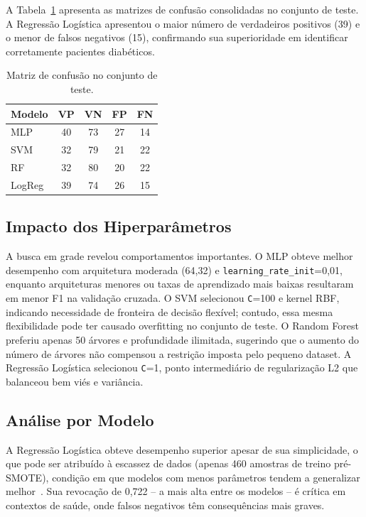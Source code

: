 \documentclass[conference]{IEEEtran}
\begin{document}
A Tabela~\ref{tab:confusao} apresenta as matrizes de confus\~ao consolidadas no conjunto de teste. A Regress\~ao Log\'{i}stica apresentou o maior n\'{u}mero de verdadeiros positivos (39) e o menor de falsos negativos (15), confirmando sua superioridade em identificar corretamente pacientes diab\'{e}ticos.

\begin{table}[H]
\caption{Matriz de confus\~ao no conjunto de teste.}
\label{tab:confusao}
\centering
\scriptsize
\setlength{\tabcolsep}{4pt}
\begin{tabular}{@{}lcccc@{}}
\toprule
Modelo & VP & VN & FP & FN \\
\midrule
MLP & 40 & 73 & 27 & 14 \\
SVM & 32 & 79 & 21 & 22 \\
RF & 32 & 80 & 20 & 22 \\
LogReg & 39 & 74 & 26 & 15 \\
\bottomrule
\end{tabular}
\end{table}

\subsection{Impacto dos Hiperpar\^{a}metros}

A busca em grade revelou comportamentos importantes. O MLP obteve melhor desempenho com arquitetura moderada (64,32) e \texttt{learning\_rate\_init}=0,01, enquanto arquiteturas menores ou taxas de aprendizado mais baixas resultaram em menor F1 na valida\c{c}\~ao cruzada. O SVM selecionou \texttt{C}=100 e kernel RBF, indicando necessidade de fronteira de decis\~ao flex\'{i}vel; contudo, essa mesma flexibilidade pode ter causado overfitting no conjunto de teste. O Random Forest preferiu apenas 50 \'{a}rvores e profundidade ilimitada, sugerindo que o aumento do n\'{u}mero de \'{a}rvores n\~ao compensou a restri\c{c}\~ao imposta pelo pequeno dataset. A Regress\~ao Log\'{i}stica selecionou \texttt{C}=1, ponto intermedi\'{a}rio de regulariza\c{c}\~ao L2 que balanceou bem vi\'{e}s e vari\^{a}ncia.

\subsection{An\'{a}lise por Modelo}

A Regress\~ao Log\'{i}stica obteve desempenho superior apesar de sua simplicidade, o que pode ser atribu\'{i}do \`{a} escassez de dados (apenas 460 amostras de treino pr\'{e}-SMOTE), condi\c{c}\~ao em que modelos com menos par\^{a}metros tendem a generalizar melhor~\cite{russel2021}. Sua revoca\c{c}\~ao de 0,722 -- a mais alta entre os modelos -- \'{e} cr\'{i}tica em contextos de sa\'{u}de, onde falsos negativos t\^{e}m consequ\^{e}ncias mais graves.
\end{document}

